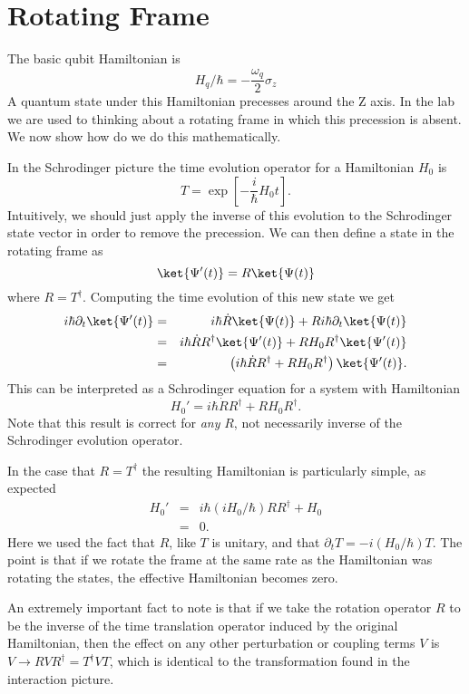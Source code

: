 \section{Rotating Frame}

The basic qubit Hamiltonian is \begin{equation}
H_q/\hbar = -\frac{\omega_q}{2}\sigma_z \end{equation}
A quantum state under this Hamiltonian precesses around the Z axis. In the lab we are used to thinking about a rotating frame in which this precession is absent. We now show how do we do this mathematically.

In the Schrodinger picture the time evolution operator for a Hamiltonian $H_0$ is \begin{equation}
T = \exp \left[ -\frac{i}{\hbar}H_0 t \right]. \end{equation}
Intuitively, we should just apply the inverse of this evolution to the Schrodinger state vector in order to remove the precession. We can then define a state in the rotating frame as \begin{equation}
\ket{\Psi'(t)} = R\ket{\Psi(t)} \end{equation}
where $R=T^{\dagger}$. Computing the time evolution of this new state we get \begin{eqnarray}
i\hbar\partial_t \ket{\Psi'(t)} &=& i\hbar \dot{R}\ket{\Psi(t)} + Ri\hbar\partial_t\ket{\Psi(t)} \\
&=& i\hbar \dot{R}R^{\dagger} \ket{\Psi'(t)} + R H_0 R^{\dagger} \ket{\Psi'(t)} \\
&=& \left( i\hbar \dot{R}R^{\dagger} + RH_0R^{\dagger} \right) \ket{\Psi'(t)}. \end{eqnarray}
This can be interpreted as a Schrodinger equation for a system with Hamiltonian \begin{equation}
H_0' = i\hbar \dot{R}R^{\dagger} + RH_0R^{\dagger}. \end{equation}
Note that this result is correct for \emph{any} $R$, not necessarily inverse of the Schrodinger evolution operator.

In the case that $R=T^{\dagger}$ the resulting Hamiltonian is particularly simple, as expected \begin{eqnarray}
H_0' &=& i\hbar (iH_0/\hbar)RR^{\dagger} + H_0 \\
&=& 0. \end{eqnarray}
Here we used the fact that $R$, like $T$ is unitary, and that $\partial_t T = -i(H_0/\hbar)T$. The point is that if we rotate the frame at the same rate as the Hamiltonian was rotating the states, the effective Hamiltonian becomes zero.

An extremely important fact to note is that if we take the rotation operator $R$ to be the inverse of the time translation operator induced by the original Hamiltonian, then the effect on any other perturbation or coupling terms $V$ is $V\rightarrow RVR^{\dagger} = T^{\dagger}VT$, which is identical to the transformation found in the interaction picture.
